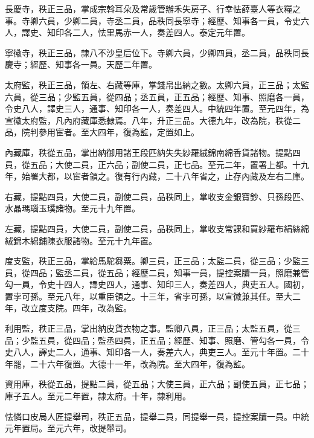 \begin{pinyinscope}
 長慶寺，秩正三品，掌成宗斡耳朵及常歲管辦禾失房子、行幸怯薛臺人等衣糧之事。寺卿六員，少卿二員，寺丞二員，品秩同長寧寺；經歷、知事各一員，令史六人，譯史、知印各二人，怯里馬赤一人，奏差四人。泰定元年置。



 寧徽寺，秩正三品，隸八不沙皇后位下。寺卿六員，少卿四員，丞二員，品秩同長慶寺；經歷、知事各一員。天歷二年置。



 太府監，秩正三品，領左、右藏等庫，掌錢帛出納之數。太卿六員，正三品；太監六員，從三品；少監五員，從四品；丞五員，正五品；經歷、知事、照磨各一員，令史八人，譯史三人，通事、知印各一人，奏差四人。中統四年置。至元四年，為宣徽太府監，凡內府藏庫悉隸焉。八年，升正三品。大德九年，改為院，秩從二品，院判參用宦者。至大四年，復為監，定置如上。



 內藏庫，秩從五品，掌出納御用諸王段匹納失失紗羅絨錦南綿香貨諸物。提點四員，從五品；大使二員，正六品；副使二員，正七品。至元二年，置署上都。十九年，始署大都，以宦者領之。復有行內藏，二十八年省之，止存內藏及左右二庫。



 右藏，提點四員，大使二員，副使二員，品秩同上，掌收支金銀寶鈔、只孫段匹、水晶瑪瑙玉璞諸物。至元十九年置。



 左藏，提點四員，大使二員，副使二員，品秩同上，掌收支常課和買紗羅布絹絲綿絨錦木綿鋪陳衣服諸物。至元十九年置。



 度支監，秩正三品，掌給馬駝芻粟。卿三員，正三品；太監二員，從三品；少監三員，從四品；監丞二員，從五品；經歷二員，知事一員，提控案牘一員，照磨兼管勾一員，令史十四人，譯史四人，通事、知印三人，奏差四人，典吏五人。國初，置孛可孫。至元八年，以重臣領之。十三年，省孛可孫，以宣徽兼其任。至大二年，改立度支院。四年，改為監。



 利用監，秩正三品，掌出納皮貨衣物之事。監卿八員，正三品；太監五員，從三品；少監五員，從四品；監丞四員，正五品；經歷、知事、照磨、管勾各一員，令史八人，譯史二人，通事、知印各一人，奏差六人，典吏三人。至元十年置。二十年罷，二十六年復置。大德十一年，改為院。至大四年，復為監。



 資用庫，秩從五品，提點二員，從五品；大使三員，正六品；副使五員，正七品；庫子五人。至元二年置，隸太府。十年，隸利用。



 怯憐口皮局人匠提舉司，秩正五品，提舉二員，同提舉一員，提控案牘一員。中統元年置局。至元六年，改提舉司。




\end{pinyinscope}
